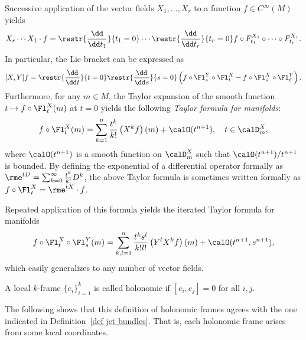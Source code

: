 \begin{rem}\label{rem 3.2.9 RS1}
    Successive application of the vector fields $X_1,\ldots,X_r$ to a function $f\in C^\infty(M)$ yields
    \[X_r\cdots X_1 \cdot f=\restr{\frac{\dd}{\dd t_1}}{t_1=0}\cdots \restr{\frac{\dd}{\dd t_r}}{t_r=0}f\circ F^{X_1}_{t_1}\circ \cdots \circ F^{X_r}_{t_r}.\]
    In particular, the Lie bracket can be expressed as
    \[[X,Y]f=\restr{\frac{\dd}{\dd t}}{t=0}\restr{\frac{\dd}{\dd s}}{s=0}\left(f\circ \Fl^Y_s\circ \Fl^X_t-f\circ \Fl^X_s\circ \Fl^Y_t\right).\label{eq Lie bracket in terms of flows}\]
    Furthermore, for any $m\in M$, the Taylor expansion of the smooth function $t\mapsto f\circ \Fl^X_t(m)$ at $t=0$ yields the following \emph{Taylor formula for manifolds}:
    \[f\circ \Fl^X_t(m)=\sum_{k=1}^n\frac{t^k}{k!}\left(X^kf\right)(m)+\calO(t^{n+1}), \quad t\in \calD^X_m,\label{eq:Taylor formula for manifolds}\]
    where $\calO(t^{n+1})$ is a smooth function on $\calD_m^X$ such that $\calO(t^{n+1})/t^{n+1}$ is bounded. By defining the exponential of a differential operator formally as $\rme^{tD}=\sum_{k=0}^\infty \frac{t^k}{k!}D^k$, the above Taylor formula is sometimes written formally as $f\circ \Fl^X_t=\rme^{t X}\cdot f$.

    Repeated application of this formula yields the iterated Taylor formula for manifolds
    \[f\circ \Fl^X_t\circ \Fl^Y_s(m)=\sum_{k,l=1}^n\frac{t^ks^l}{k!l!}\left(Y^lX^kf\right)(m)+\calO(t^{n+1},s^{n+1}),\label{eq: Taylor formula for two fields}\]
    which easily generalizes to any number of vector fields.
\end{rem}


\begin{defn}
    A local $k$-frame $\{e_i\}_{i=1}^k$ is called holonomic if $[e_i,e_j]=0$ for all $i,j$.
\end{defn}

The following shows that this definition of holonomic frames agrees with the one indicated in Definition~\ref{def jet bundles}. That is, each holonomic frame arises from some local coordinates.

